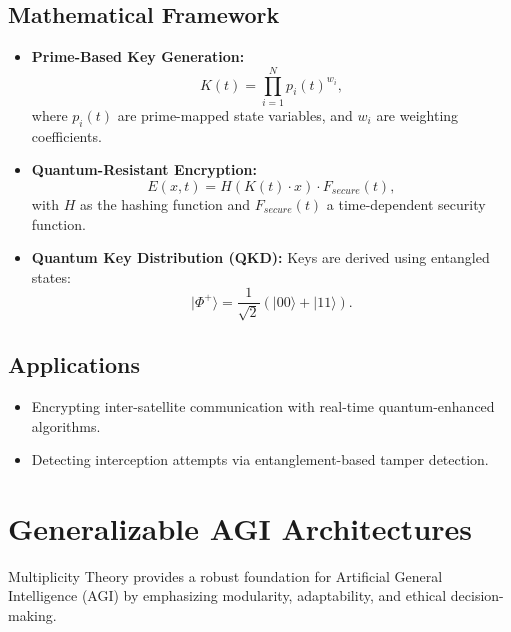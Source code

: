 \documentclass{article}
\theoremstyle{plain}
\begin{document}
\subsection{Mathematical Framework}
\begin{itemize}
  \item \textbf{Prime-Based Key Generation:}
  \begin{equation}
  K(t) = \prod_{i=1}^N p_i(t)^{w_i},
  \end{equation}
  where $p_i(t)$ are prime-mapped state variables, and $w_i$ are weighting coefficients.

  \item \textbf{Quantum-Resistant Encryption:}
  \begin{equation}
  E(x,t) = H(K(t) \cdot x) \cdot F_{secure}(t),
  \end{equation}
  with $H$ as the hashing function and $F_{secure}(t)$ a time-dependent security function.

  \item \textbf{Quantum Key Distribution (QKD):}
  Keys are derived using entangled states:
  \begin{equation}
  |\Phi^+\rangle = \frac{1}{\sqrt{2}} \left( |00\rangle + |11\rangle \right).
  \end{equation}
\end{itemize}

\subsection{Applications}
\begin{itemize}
  \item Encrypting inter-satellite communication with real-time quantum-enhanced algorithms.
  \item Detecting interception attempts via entanglement-based tamper detection.
\end{itemize}

\section{Generalizable AGI Architectures}
Multiplicity Theory provides a robust foundation for Artificial General Intelligence (AGI) by emphasizing modularity, adaptability, and ethical decision-making.
\end{document}
